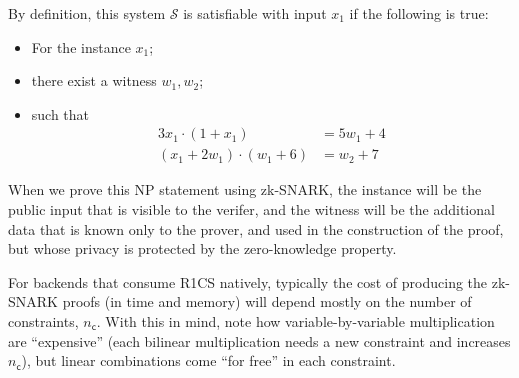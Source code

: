 \documentclass[a4paper,12pt]{article}
\newcommand{\NPstatementNOperiod}[3]{
{\color{NPcolor}
\begin{itemize}[nosep]
\item[] #1;
\item[] #2;
\item[] #3
\end{itemize}
}
}
\newcommand{\NumConstr}{n_{\mathsf{c}}}
\newcommand{\inst}{x}
\newcommand{\wit}{w}
\newcommand{\System}{\mathcal{S}}
\begin{document}
By definition, this system $\System$ is satisfiable with input $\inst_1$ if the following is true:
\NPstatementNOperiod
  {For the instance $\inst_1$}
  {there exist a witness $\wit_1,\wit_2$}
  {such that
  \begin{equation*}
  \begin{aligned}
  3\inst_1 \cdot (1+\inst_1) &= 5\wit_1 + 4 \\
  (\inst_1 + 2\wit_1) \cdot (\wit_1+6) &= \wit_2 + 7  
  \end{aligned}
  \end{equation*}
  }

When we prove this NP statement using zk-SNARK, the instance will be the public input that is visible to the verifer, and the witness will be the additional data that is known only to the prover, and used in the construction of the proof, but whose privacy is protected by the zero-knowledge property.

For backends that consume R1CS natively, typically the cost of producing the zk-SNARK proofs (in time and memory) will depend mostly on the number of constraints, $\NumConstr$. With this in mind, note how variable-by-variable multiplication are ``expensive'' (each bilinear multiplication needs a new constraint and increases $\NumConstr$), but linear combinations come ``for free'' in each constraint. 
\end{document}

